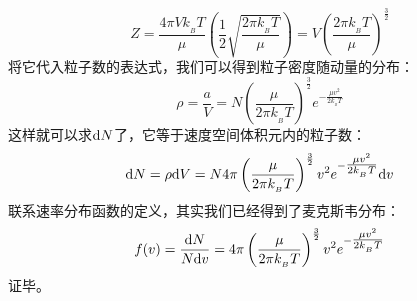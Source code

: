 \begin{prove}
\begin{equation}
                Z = \frac{4 \pi V k_{_B}T}{\mu} (\frac{1}{2}\sqrt{\frac{2\pi k_{_B}T}{\mu}}) = V\left(\frac{2\pi k_{_B}T}{\mu}\right)^{\frac{3}{2}}
                \label{of_Z}
            \end{equation}
            将它代入粒子数的表达式，我们可以得到粒子密度随动量的分布：
            \begin{equation}
                \rho = \frac{a}{V} = N\left(\frac{\mu}{2\pi k_{_B}T}\right)^{\frac{3}{2}}e^{-\tfrac{\mu v^{2}}{2k_{_B}T}}
            \end{equation}
            这样就可以求$\mathrm{d}{N}$了，它等于速度空间体积元内的粒子数：
            \begin{equation}
                \mathrm{d}{N} = \rho \mathrm{d}{V} = N4\pi \left(\frac{\mu}{2\pi k_{_B}T}\right)^{\frac{3}{2}}v^{2}e^{-\tfrac{\mu v^{2}}{2k_{_B}T}}\mathrm{d}{v}
            \end{equation}
            联系速率分布函数的定义，其实我们已经得到了麦克斯韦分布：
            \begin{equation}
                f(v) = \frac{\mathrm{d}{N}}{N\mathrm{d}{v}} = 4\pi \left(\frac{\mu}{2\pi k_{_B}T}\right)^{\frac{3}{2}}v^{2}e^{-\tfrac{\mu v^{2}}{2k_{_B}T}}
            \end{equation}
            证毕。
        \end{prove}
